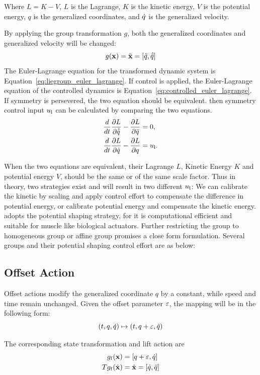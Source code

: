 Where $L=K-V$, $L$ is the Lagrange, $K$ is the kinetic energy, $V$ is the potential energy, $q$ is the generalized coordinates, and $\dot{q}$ is the generalized velocity.

By applying the group transformation $g$, both the generalized coordinates and generalized velocity will be changed:
\[
g(\mathbf{x})=\tilde{\mathbf{x}}=[\tilde{q}, \dot{\tilde{q}}]
\]
The Euler-Lagrange equation for the transformed dynamic system is Equation~\ref{eq:liegroup_euler_lagrange}.
If control is applied, the Euler-Lagrange equation of the controlled dynamics is Equation~\ref{eq:controlled_euler_lagrange}. 
If symmetry is persevered, the two equation should be equivalent.
then symmetry control input $u_{\mathrm{l}}$ can be calculated by comparing the two equations.
\begin{align}
\frac{d}{dt} \frac{\partial L}{\partial \dot{\tilde{q}}} - \frac{\partial L}{\partial \tilde{q} }&=0,\label{eq:liegroup_euler_lagrange}\\
\frac{d}{dt} \frac{\partial L}{\partial \dot{q}} - \frac{\partial L}{\partial q}&=u_{\mathrm{l}}. \label{eq:controlled_euler_lagrange}
\end{align}

When the two equations are equivalent, their Lagrange $L$, Kinetic Energy $K$ and potential energy $V$, should be the same or of the same scale factor.
Thus in theory, two strategies exist and will result in two different $u_{\mathrm{l}}$:
We can calibrate the kinetic by scaling and apply control effort to compensate the difference in potential energy, or calibrate potential energy and compensate the kinetic energy.
\moit adopts the potential shaping strategy, for it is computational efficient and suitable for muscle like biological actuators.
Further restricting the group to homogeneous group or affine group promises a close form formulation.
Several groups and their potential shaping control effort are as below:



\subsection*{ Offset Action}
Offset actions  modify the generalized coordinate $q$ by a constant, while speed and time remain unchanged.
Given the offset parameter $\varepsilon$, the mapping will be in the following form:
\[
(t,q,\dot{q}) \mapsto (t,q+\varepsilon,\dot{q})
\]

The corresponding state transformation and lift action are
\begin{align}
g_{\mathrm{f}}(\mathbf{x}) &= [q+\varepsilon,\dot{q}] \\
Tg_{\mathrm{f}}(\dot{\mathbf{x}})&=\dot{\mathbf{x}}=[\dot{q},\ddot{q}]
\end{align}


